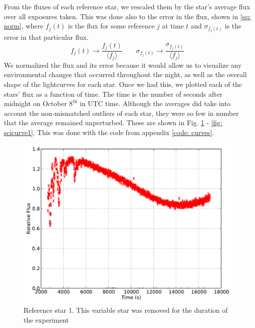 \documentclass{aastex61}
\begin{document}
From the fluxes of each reference star, we rescaled them by the star's average flux over all exposures taken. This was done also to the error in the flux, shown in \eqref{eq: norm}, where $f_{j}(t)$ is the flux for some reference $j$ at time $t$ and $\sigma_{f_{j}(t)}$ is the error in that particular flux.
\begin{equation} \label{eq: norm}
f_{j}(t)  \rightarrow \frac{f_{j}(t)}{\langle f_{j} \rangle}       \;\;\;\;\;\;\;\sigma_{f_{j}(t)} \rightarrow \frac{\sigma_{f_{j}(t)}}{\langle f_{j} \rangle}
\end{equation}
We normalized the flux and its error because it would allow us to visualize any environmental changes that occurred throughout the night, as well as the overall shape of the lightcurves for each star. Once we had this, we plotted each of the stars' flux as a function of time. The time is the number of seconds after midnight on October $8^{\text{th}}$ in UTC time. Although the averages did take into account the non-mismatched outliers of each star, they were so few in number that the average remained unperturbed. These are shown in Fig. \ref{fig: refcurve1} - \ref{fig: scicurve1}. This was done with the code from appendix \ref{code: curves}. 
\begin{figure}[hbt!]
	\centering
	\includegraphics[scale = .45]{exo_curves1.pdf}
    \caption{Reference star 1. This variable star was removed for the duration of the experiment}
    \label{fig: refcurve1}
\end{figure}
\end{document}
